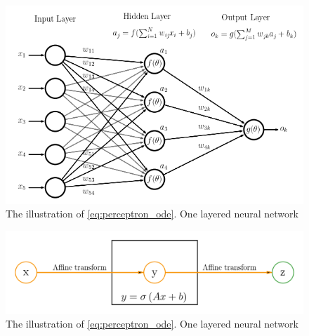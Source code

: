 \begin{figure}[h]
	\centering
	\includegraphics[width=\textwidth]{images/chapter2/neural_network_fcn.png}
	\caption{The illustration of \eqref{eq:perceptron_ode}. One layered neural network}
	\label{fig:simple_net}
\end{figure}

\begin{figure}[h]
	\centering
	\includegraphics[width=\textwidth]{images/chapter2/simple_net.png}
	\caption{The illustration of \eqref{eq:perceptron_ode}. One layered neural network}
	\label{fig:simple_net}
\end{figure}

